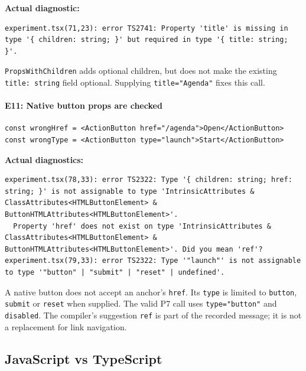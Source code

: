 \documentclass[
  11pt,
]{article}
\newcommand{\passthrough}[1]{#1}
\let\originalparagraph\paragraph
\renewcommand{\paragraph}[1]{\originalparagraph{#1}\mbox{}}
\begin{document}
\textbf{Actual diagnostic:}

\begin{lstlisting}
experiment.tsx(71,23): error TS2741: Property 'title' is missing in type '{ children: string; }' but required in type '{ title: string; }'.
\end{lstlisting}

\passthrough{\lstinline!PropsWithChildren!} adds optional children, but
does not make the existing \passthrough{\lstinline!title: string!} field
optional. Supplying \passthrough{\lstinline!title="Agenda"!} fixes this
call.

\paragraph{E11: Native button props are
checked}\label{e11-native-button-props-are-checked}

\begin{lstlisting}
const wrongHref = <ActionButton href="/agenda">Open</ActionButton>
const wrongType = <ActionButton type="launch">Start</ActionButton>
\end{lstlisting}

\textbf{Actual diagnostics:}

\begin{lstlisting}
experiment.tsx(78,33): error TS2322: Type '{ children: string; href: string; }' is not assignable to type 'IntrinsicAttributes & ClassAttributes<HTMLButtonElement> & ButtonHTMLAttributes<HTMLButtonElement>'.
  Property 'href' does not exist on type 'IntrinsicAttributes & ClassAttributes<HTMLButtonElement> & ButtonHTMLAttributes<HTMLButtonElement>'. Did you mean 'ref'?
experiment.tsx(79,33): error TS2322: Type '"launch"' is not assignable to type '"button" | "submit" | "reset" | undefined'.
\end{lstlisting}

A native button does not accept an anchor's
\passthrough{\lstinline!href!}. Its \passthrough{\lstinline!type!} is
limited to \passthrough{\lstinline!button!},
\passthrough{\lstinline!submit!} or \passthrough{\lstinline!reset!} when
supplied. The valid P7 call uses \passthrough{\lstinline!type="button"!}
and \passthrough{\lstinline!disabled!}. The compiler's suggestion
\passthrough{\lstinline!ref!} is part of the recorded message; it is not
a replacement for link navigation.

\subsection{JavaScript vs TypeScript}\label{javascript-vs-typescript}
\end{document}
